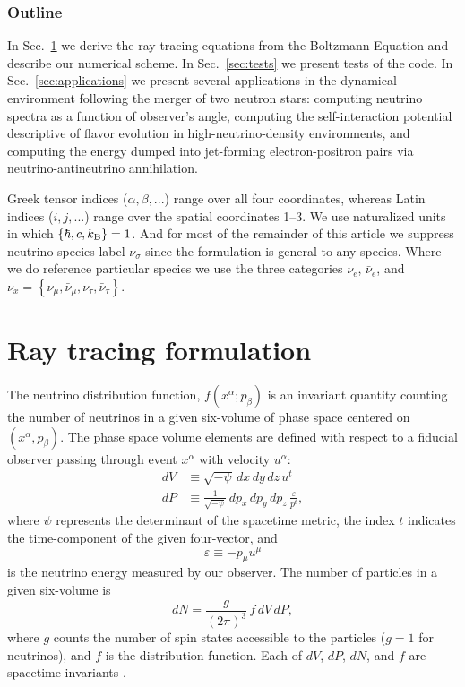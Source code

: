 \documentclass[aps,floatfix,prd,superscriptaddress,twocolumn]{revtex4-1}
\begin{document}
\subsubsection*{Outline}
In Sec.~\ref{sec:formulation} we derive the ray tracing equations from the
Boltzmann Equation and describe our numerical scheme.
In Sec.~\ref{sec:tests} we present tests of the code.
In Sec.~\ref{sec:applications} we present several applications
in the dynamical environment following the merger of two neutron stars:
computing neutrino spectra as a function of observer's angle,
computing the self-interaction potential descriptive of flavor evolution
in high-neutrino-density environments,
and computing the energy dumped into jet-forming electron-positron
pairs via neutrino-antineutrino annihilation.

Greek tensor indices ($\alpha, \beta, ...$) range over all four coordinates,
whereas Latin indices ($i, j, ...$) range over the spatial coordinates 1--3.
We use naturalized units in which $\{\hbar,c,k_{\rm B}\}=1$.
And for most of the remainder of this article we suppress neutrino species label
$\nu_\sigma$ since the formulation is general to any species.
Where we do reference particular species we use the three categories
$\nu_e$, $\bar{\nu}_e$, and
$\nu_x=\left\{\nu_\mu,\bar{\nu}_\mu,\nu_\tau,\bar{\nu}_\tau\right\}$.

\section{Ray tracing formulation}
\label{sec:formulation}
The neutrino distribution function, $f(x^\alpha; p_\beta)$ is an invariant
quantity counting the number of neutrinos in a given six-volume of phase
space centered on $(x^\alpha,p_\beta)$.
The phase space volume elements are defined with respect to a fiducial
observer passing through event $x^\alpha$ with velocity $u^\alpha$:
\begin{align}
  \label{eqn:dV}
  dV & \equiv \sqrt{-\psi} \, dx \, dy \, dz \, u^t \\
  \label{eqn:dP}
  dP & \equiv \frac{1}{\sqrt{-\psi}} \, dp_x \, dp_y \, dp_z \,
  \frac{\varepsilon}{p^t},
\end{align}
where $\psi$ represents the determinant of the spacetime metric,
the index $t$ indicates the time-component of the given four-vector, and
\begin{equation}
  \label{eqn:varepsilon}
  \varepsilon \equiv -p_\mu u^\mu
\end{equation}
is the neutrino energy measured by our observer.
The number of particles in a given six-volume is
\begin{equation}
  dN=\frac{g}{(2\pi)^3}\,f\,dV\,dP,
\end{equation}
where $g$ counts the number of spin states accessible to the
particles ($g=1$ for neutrinos), and $f$ is the distribution function.
Each of $dV$, $dP$, $dN$, and $f$ are spacetime invariants
\citep{debb2009-gr_boltzmann_1, debb2009-gr_boltzmann_2, lind1966-gr_boltzmann}.
\end{document}
